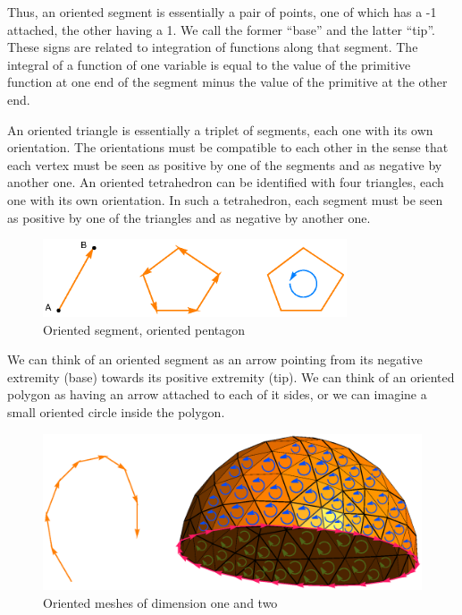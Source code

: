 Thus, an oriented segment is essentially a pair of points, one of which has a \hbox{-1}
attached, the other having a 1.
We call the former ``base'' and the latter ``tip''.
These signs are related to integration of functions along that segment.
The integral of a function of one variable is equal to the value of the 
primitive function at one end of the segment minus the value of the primitive at the other end.

An oriented triangle is essentially a triplet of segments, each one with its own orientation.
The orientations must be compatible to each other in the sense that each vertex 
must be seen as positive by one of the segments and as negative by another one.
An oriented tetrahedron can be identified with four triangles, each one with its own
orientation.
In such a tetrahedron, each segment must be seen as positive by one of the triangles and
as negative by another one.

\begin{figure}[ht] \centering
  \includegraphics[width=90mm]{oriented-cells.eps}
  \caption{Oriented segment, oriented pentagon}
  \label{\numb section 1.\numb fig 2}
\end{figure}

We can think of an oriented segment as an arrow pointing from its negative extremity (base)
towards its positive extremity (tip).
We can think of an oriented polygon as having an arrow attached to each of it sides,
or we can imagine a small oriented circle inside the polygon.

\begin{figure} \centering
  \includegraphics[width=125mm]{hemisphere-7}
  \caption{Oriented meshes of dimension one and two}
  \label{\numb section 1.\numb fig 3}
\end{figure}

